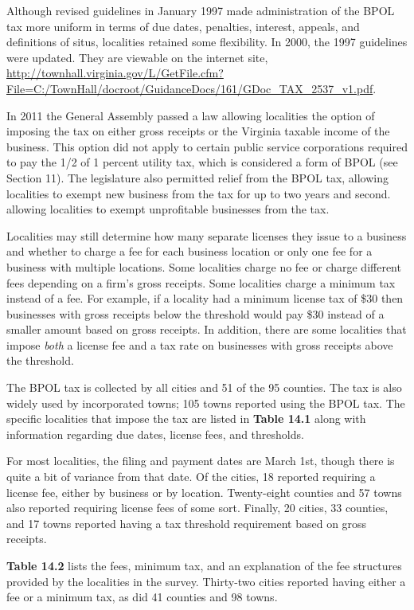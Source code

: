 \documentclass[
]{book}
\begin{document}
Although revised guidelines in January 1997 made administration of the BPOL tax more uniform in terms of due dates, penalties, interest, appeals, and definitions of situs, localities retained some flexibility. In 2000, the 1997 guidelines were updated. They are viewable on the internet site, \url{http://townhall.virginia.gov/L/GetFile.cfm?File=C:/TownHall/docroot/GuidanceDocs/161/GDoc_TAX_2537_v1.pdf}.

In 2011 the General Assembly passed a law allowing localities the option of imposing the tax on either gross receipts or the Virginia taxable income of the business. This option did not apply to certain public service corporations required to pay the 1/2 of 1 percent utility tax, which is considered a form of BPOL (see Section 11). The legislature also permitted relief from the BPOL tax, allowing localities to exempt new business from the tax for up to two years and second. allowing localities to exempt unprofitable businesses from the tax.

Localities may still determine how many separate licenses they issue to a business and whether to charge a fee for each business location or only one fee for a business with multiple locations. Some localities charge no fee or charge different fees depending on a firm's gross receipts. Some localities charge a minimum tax instead of a fee. For example, if a locality had a minimum license tax of \$30 then businesses with gross receipts below the threshold would pay \$30 instead of a smaller amount based on gross receipts. In addition, there are some localities that impose \emph{both} a license fee and a tax rate on businesses with gross receipts above the threshold.

The BPOL tax is collected by all cities and 51 of the 95 counties. The tax is also widely used by incorporated towns; 105 towns reported using the BPOL tax. The specific localities that impose the tax are listed in \textbf{Table 14.1} along with information regarding due dates, license fees, and thresholds.

For most localities, the filing and payment dates are March 1st, though there is quite a bit of variance from that date. Of the cities, 18 reported requiring a license fee, either by business or by location. Twenty-eight counties and 57 towns also reported requiring license fees of some sort. Finally, 20 cities, 33 counties, and 17 towns reported having a tax threshold requirement based on gross receipts.

\textbf{Table 14.2} lists the fees, minimum tax, and an explanation of the fee structures provided by the localities in the survey. Thirty-two cities reported having either a fee or a minimum tax, as did 41 counties and 98 towns.
\end{document}
